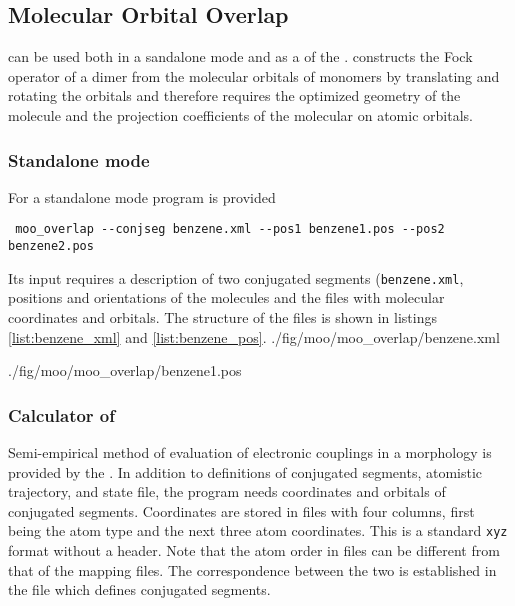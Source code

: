 \subsection{Molecular Orbital Overlap}

\moo can be used both in a sandalone mode and as a \calculator of the \votcact. \moo constructs the Fock operator of a dimer from the  molecular orbitals of monomers by translating and rotating the orbitals and therefore requires the optimized geometry of the molecule and the projection coefficients of the molecular on atomic orbitals. 


\subsubsection{Standalone mode}
For a standalone mode program \overlap is provided 
\begin{verbatim}
 moo_overlap --conjseg benzene.xml --pos1 benzene1.pos --pos2 benzene2.pos
\end{verbatim}
Its input requires a description of two conjugated segments (\texttt{benzene.xml}, positions and orientations of the molecules and the files with molecular coordinates and orbitals. The structure of the files is shown in listings \ref{list:benzene_xml} and  \ref{list:benzene_pos}.
\vskip 0.1cm
 {./fig/moo/moo_overlap/benzene.xml}

\vskip 0.1cm

 {./fig/moo/moo_overlap/benzene1.pos}


\subsubsection{Calculator of \votcact}
Semi-empirical method of evaluation of electronic couplings in a morphology is provided by the \integrals \calculator. In addition to definitions of conjugated segments, atomistic trajectory, and state file, the program needs coordinates and orbitals of conjugated segments. Coordinates are stored in \xyz files with four columns, first being the atom type and the next three atom coordinates. This is a standard \texttt{xyz} format without a header. Note that the atom order in \xyz files can be different from that of the mapping files. The correspondence between the two is established in the file which defines conjugated segments.
